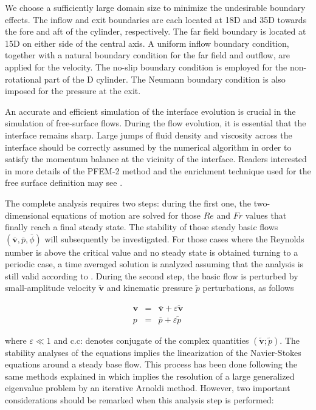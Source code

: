 \documentclass[%
 reprint,
 amsmath,amssymb,
 aps,
prl
]{revtex4-1}
\begin{document}
We choose a sufficiently large domain size to minimize the undesirable boundary effects. The inflow and exit boundaries are each located at 18D and 35D towards the fore and aft of the cylinder, respectively. The far field boundary is located at 15D on either side of the central axis. A uniform inflow boundary condition, together with a natural boundary condition for the far field and outflow, are applied for the velocity. The no-slip boundary condition is employed for the non-rotational part of the D cylinder. The Neumann boundary condition is also imposed for the pressure at the exit.

An accurate and efficient simulation of the interface evolution is crucial in the simulation of free-surface flows. During the flow evolution, it is essential that the interface remains sharp. Large jumps of fluid density and viscosity across the interface should be correctly assumed by the numerical algorithm in order to satisfy the momentum balance at the vicinity of the interface. Readers interested in more details of the PFEM-2 method and the enrichment technique used for the free surface definition may see \cite{Gimenez2015186}.

The complete analysis requires two steps: during the first one, the two-dimensional equations of motion are solved for those $Re$ and $Fr$ values that finally reach a final steady state. The stability of those steady basic flows $(\overline{\mathbf{v}}, \overline{p},\overline{\phi})$ will subsequently be investigated. For those cases where the Reynolds number is above the critical value and no steady state is obtained turning to a periodic case, a time averaged solution is analyzed assuming that the analysis is still valid according to \cite{SippLebedev}.  During the second step, the basic flow is perturbed by small-amplitude velocity $\widetilde{\mathbf{v}}$ and kinematic pressure $\widetilde{p}$ perturbations, as follows

\begin{eqnarray}
  \mathbf{v} &=& \overline{\mathbf{v}} + \varepsilon \widetilde{\mathbf{v}} \\
  p &=& \overline{p} + \varepsilon \widetilde{p}
\end{eqnarray}


where $\varepsilon\ll 1$ and c.c: denotes conjugate of the complex quantities $(\widetilde{\mathbf{v}}; \widetilde{p})$. The stability analyses of the equations implies the linearization of the Navier-Stokes equations around a steady base flow. This process has been done following the same methods explained in \cite{Gonzalez07} which implies the resolution of a large generalized eigenvalue problem by an iterative Arnoldi method. However, two important considerations should be remarked when this analysis step is performed:
\end{document}
